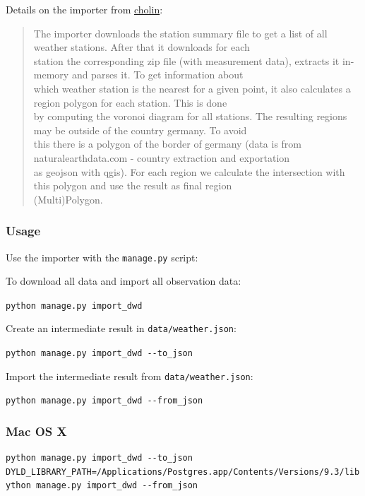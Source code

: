 \documentclass[paper=a4, fontsize=11pt]{scrartcl} %
\numberwithin{equation}{section} %
\numberwithin{figure}{section} %
\numberwithin{table}{section} %
\begin{document}
Details on the importer from
\href{https://github.com/cholin/fuberlin_spatial_db_project/blob/master/scripts/dwd/README.md}{cholin}:

\begin{quote}
The importer downloads the station summary file to get a list of all
weather stations. After that it downloads for each\\station the
corresponding zip file (with measurement data), extracts it in-memory
and parses it. To get information about\\which weather station is the
nearest for a given point, it also calculates a region polygon for each
station. This is done\\by computing the voronoi diagram for all
stations. The resulting regions may be outside of the country germany.
To avoid\\this there is a polygon of the border of germany (data is from
naturalearthdata.com - country extraction and exportation\\as geojson
with qgis). For each region we calculate the intersection with this
polygon and use the result as final region\\(Multi)Polygon.
\end{quote}

\subsubsection*{Usage}\label{usage-1}

Use the importer with the \texttt{manage.py} script:

To download all data and import all observation data:

\texttt{python\ manage.py\ import\_dwd}

Create an intermediate result in \texttt{data/weather.json}:

\texttt{python\ manage.py\ import\_dwd\ -\/-to\_json}

Import the intermediate result from \texttt{data/weather.json}:

\texttt{python\ manage.py\ import\_dwd\ -\/-from\_json}

\subsubsection*{Mac OS X}\label{mac-os-x-1}

\begin{lstlisting}[breaklines=true]
python manage.py import_dwd --to_json
DYLD_LIBRARY_PATH=/Applications/Postgres.app/Contents/Versions/9.3/lib ython manage.py import_dwd --from_json
\end{lstlisting}
\end{document}
